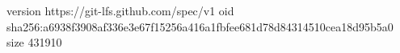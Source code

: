 version https://git-lfs.github.com/spec/v1
oid sha256:a6938f3908af336e3e67f15256a416a1fbfee681d78d84314510cea18d95b5a0
size 431910
